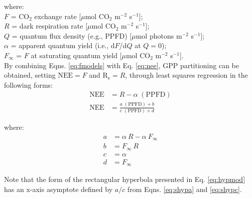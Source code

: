 \noindent where:\\
\indent $F$ = CO$_2$ exchange rate [$\mu$mol CO$_2$ m$^{-2}$ s$^{-1}$];\\
\indent $R$ = dark respiration rate [$\mu$mol CO$_2$ m$^{-2}$ s$^{-1}$];\\
\indent $Q$ = quantum flux density (e.g., PPFD) [$\mu$mol photons m$^{-2}$ s$^{-1}$];\\
\indent $\alpha$ = apparent quantum yield (i.e., d$F$/d$Q$ at $Q=0$);\\
\indent $F_{\infty}$ = $F$ at saturating quantum yield [$\mu$mol CO$_2$ m$^{-2}$ s$^{-1}$].\\

By combining Eqns. \ref{eq:fmodels} with Eq. \ref{eq:nee}, GPP partitioning can be obtained, setting $\text{NEE} = F$ and $\text{R}_{\text{e}} = R$, through least squares regression in the following forms:
\begin{subequations}
\label{eq:neemodels}
\begin{align}
    \text{NEE} &= R - \alpha\; (\text{PPFD}) \label{eq:linmod}\\
    \text{NEE} &= \frac{a\; (\text{PPFD}) + b}
                       {c\; (\text{PPFD}) + d}\label{eq:hypmod}
\end{align}
\end{subequations}

\noindent where:
\begin{subequations}
\label{eq:shyp}
\begin{align}
    a&= \alpha\: R - \alpha\: F_{\infty} \label{eq:shypa}\\
    b&= F_{\infty}\: R \label{eq:shypb}\\
    c&= \alpha \label{eq:shypc}\\
    d&= F_{\infty} \label{eq:shypd}
\end{align}
\end{subequations}

\noindent Note that the form of the rectangular hyperbola presented in Eq. \ref{eq:hypmod} has an x-axis asymptote defined by $a/c$ from Eqns. \ref{eq:shypa} and \ref{eq:shypc}. 


